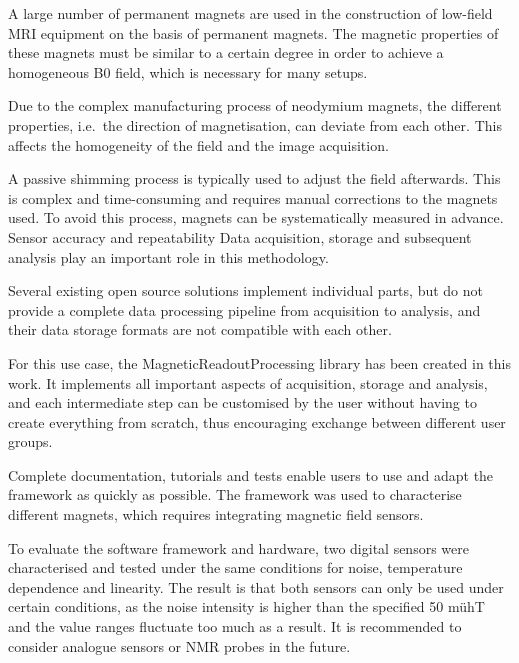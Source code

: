 A large number of permanent magnets are used in the construction of
low-field MRI equipment on the basis of permanent magnets. The magnetic
properties of these magnets must be similar to a certain degree in order
to achieve a homogeneous B0 field, which is necessary for many setups.

Due to the complex manufacturing process of neodymium magnets, the
different properties, i.e.~the direction of magnetisation, can deviate
from each other. This affects the homogeneity of the field and the image
acquisition.

A passive shimming process is typically used to adjust the field
afterwards. This is complex and time-consuming and requires manual
corrections to the magnets used. To avoid this process, magnets can be
systematically measured in advance. Sensor accuracy and repeatability
Data acquisition, storage and subsequent analysis play an important role
in this methodology.

Several existing open source solutions implement individual parts, but
do not provide a complete data processing pipeline from acquisition to
analysis, and their data storage formats are not compatible with each
other.

For this use case, the MagneticReadoutProcessing library has been
created in this work. It implements all important aspects of
acquisition, storage and analysis, and each intermediate step can be
customised by the user without having to create everything from scratch,
thus encouraging exchange between different user groups.

Complete documentation, tutorials and tests enable users to use and
adapt the framework as quickly as possible. The framework was used to
characterise different magnets, which requires integrating magnetic
field sensors.

To evaluate the software framework and hardware, two digital sensors
were characterised and tested under the same conditions for noise,
temperature dependence and linearity. The result is that both sensors
can only be used under certain conditions, as the noise intensity is
higher than the specified 50 mühT and the value ranges fluctuate too
much as a result. It is recommended to consider analogue sensors or NMR
probes in the future.

